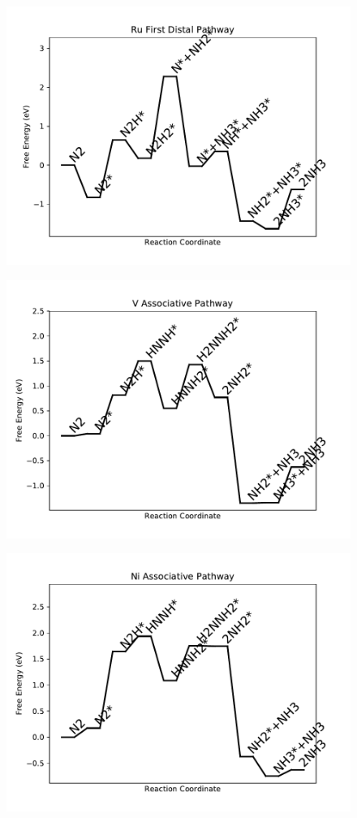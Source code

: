 \begin{figure}
\includegraphics[width=0.8\linewidth]{data/plots/Ru_distal_1.pdf}
\label{fig:Ru_distal_1}
\end{figure}

\begin{figure}
\includegraphics[width=0.8\linewidth]{data/plots/V_associative.pdf}
\label{fig:V_associative}
\end{figure}

\begin{figure}
\includegraphics[width=0.8\linewidth]{data/plots/Ni_associative.pdf}
\label{fig:Ni_associative}
\end{figure}

